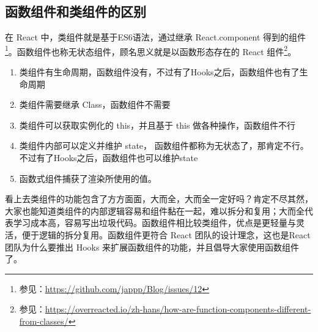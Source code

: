 \documentclass[../../../interview-questions.tex]{subfiles}
\begin{document}
\subsection{函数组件和类组件的区别}

在 React 中，类组件就是基于ES6语法，通过继承 React.component 得到的组件\footnote{参见：\url{https://github.com/jappp/Blog/issues/12}}。函数组件也称无状态组件，顾名思义就是以函数形态存在的 React 组件\footnote{参见：\url{https://overreacted.io/zh-hans/how-are-function-components-different-from-classes/}}。

\begin{enumerate}
    \item{类组件有生命周期，函数组件没有，不过有了Hooks之后，函数组件也有了生命周期}
    \item{类组件需要继承 Class，函数组件不需要}
    \item{类组件可以获取实例化的 this，并且基于 this 做各种操作，函数组件不行}
    \item {类组件内部可以定义并维护 state， 函数组件都称为无状态了，那肯定不行。不过有了Hooks之后，函数组件也可以维护state} 
    \item {函数式组件捕获了渲染所使用的值。}
\end{enumerate}

看上去类组件的功能包含了方方面面，大而全，大而全一定好吗？肯定不尽其然，大家也能知道类组件的内部逻辑容易和组件黏在一起，难以拆分和复用；大而全代表学习成本高，容易写出垃圾代码。函数组件相比较类组件，优点是更轻量与灵活，便于逻辑的拆分复用。函数组件更符合 React 团队的设计理念，这也是React团队为什么要推出 Hooks 来扩展函数组件的功能，并且倡导大家使用函数组件了。
\end{document}
